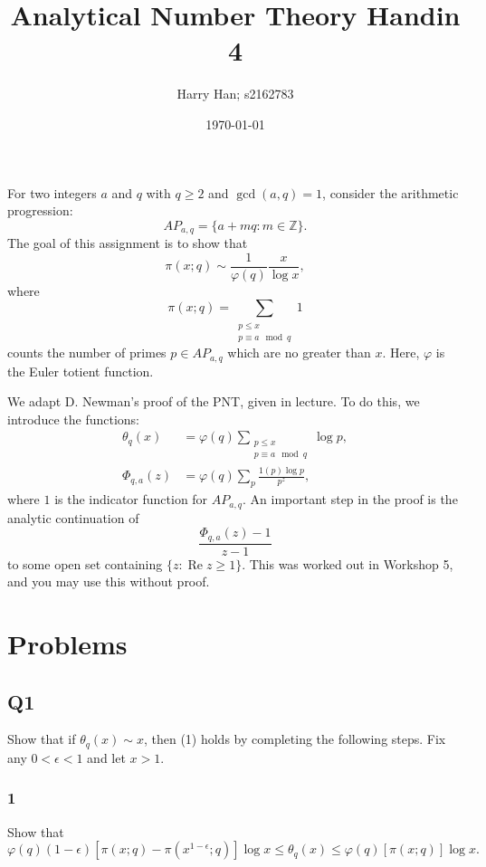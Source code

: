 \documentclass{article}
\title{Analytical Number Theory Handin 4}
\author{Harry Han; s2162783}
\date{\today}
\theoremstyle{definition}
\theoremstyle{definition}
\theoremstyle{remark}
\begin{document}
\maketitle

For two integers $a$ and $q$ with $q \geq 2$ and $\gcd(a, q) = 1$, consider the arithmetic progression:
\[ AP_{a,q} = \{a + mq : m \in \mathbb{Z} \}. \]
The goal of this assignment is to show that
\begin{equation}
    \pi(x; q) \sim \frac{1}{\varphi(q)} \frac{x}{\log x},
\end{equation}
where
\[ \pi(x; q) = \sum_{\substack{p \leq x \\ p \equiv a \mod q}} 1 \]
counts the number of primes $p \in AP_{a,q}$ which are no greater than $x$. Here, $\varphi$ is the Euler totient function.

We adapt D. Newman's proof of the PNT, given in lecture. To do this, we introduce the functions:
\begin{align*}
    \theta_q(x) &= \varphi(q) \sum_{\substack{p \leq x \\ p \equiv a \mod q}} \log p, \\
    \Phi_{q,a}(z) &= \varphi(q) \sum_p \frac{1(p) \log p}{p^z},
\end{align*}
where $1$ is the indicator function for $AP_{a,q}$. An important step in the proof is the analytic continuation of
\[ \frac{\Phi_{q,a}(z) - 1}{z - 1} \]
to some open set containing $\{z : \operatorname{Re} z \geq 1 \}$. This was worked out in Workshop 5, and you may use this without proof.

\section*{Problems}
	
\subsection*{Q1}

Show that if $\theta_q(x) \sim x$, then (1) holds by completing the following steps. Fix any $0 < \epsilon < 1$ and let $x > 1$.

\subsubsection*{1}
Show that
\[ \varphi(q)(1-\epsilon)[\pi(x; q) - \pi(x^{1-\epsilon}; q)] \log x \leq \theta_q(x) \leq \varphi(q)[\pi(x; q)] \log x. \]
\end{document}
